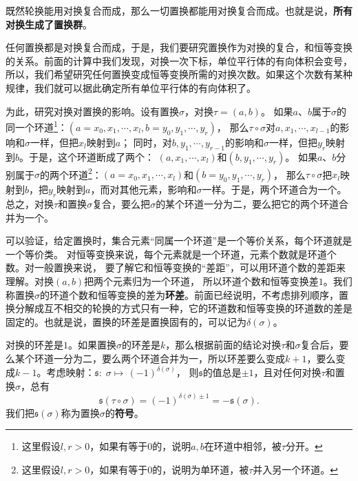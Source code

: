 \documentclass[12pt,UTF8,fontset=none]{ctexbook}
\begin{document}
既然轮换能用对换复合而成，那么一切置换都能用对换复合而成。也就是说，\textbf{所有对换生成了置换群}。

任何置换都是对换复合而成，于是，我们要研究置换作为对换的复合，和恒等变换的关系。前面的计算中我们发现，对换一次下标，单位平行体的有向体积会变号，所以，我们希望研究任何置换变成恒等变换所需的对换次数。如果这个次数有某种规律，我们就可以据此确定所有单位平行体的有向体积了。

为此，研究对换对置换的影响。设有置换$\sigma$，对换$\tau = (a, b)$。
如果$a$、$b$属于$\sigma$的同一个环道\footnote{这里假设$l,r>0$，如果有等于$0$的，说明$a,b$在环道中相邻，被$\tau$分开。}：$(a=x_0, x_1, \cdots, x_l, b=y_0, y_1, \cdots, y_r)$，
那么$\tau\circ\sigma$对$a,x_1, \cdots, x_{l-1}$的影响和$\sigma$一样，但把$x_l$映射到$a$；
同时，对$b,  y_1, \cdots, y_{r-1}$的影响和$\sigma$一样，但把$y_r$映射到$b$。于是，这个环道断成了两个：
$(a, x_1, \cdots, x_l)$和$(b, y_1, \cdots, y_r)$。
如果$a$、$b$分别属于$\sigma$的两个环道\footnote{这里假设$l,r>0$，如果有等于$0$的，说明为单环道，被$\tau$并入另一个环道。}：$(a=x_0, x_1, \cdots, x_l)$和$(b=y_0, y_1, \cdots, y_r)$，
那么$\tau\circ\sigma$把$x_l$映射到$b$，把$y_r$映射到$a$，而对其他元素，影响和$\sigma$一样。于是，两个环道合为一个。
总之，对换$\tau$和置换$\sigma$复合，要么把$\sigma$的某个环道一分为二，要么把它的两个环道合并为一个。

可以验证，给定置换时，集合元素“同属一个环道”是一个等价关系，每个环道就是一个等价类。
对恒等变换来说，每个元素就是一个环道，元素个数就是环道个数。对一般置换来说，
要了解它和恒等变换的“差距”，可以用环道个数的差距来理解。对换$(a, b)$把两个元素归为一个环道，
所以环道个数和恒等变换差$1$。我们称置换$\sigma$的环道个数和恒等变换的差为\textbf{环差}。前面已经说明，不考虑排列顺序，置换分解成互不相交的轮换的方式只有一种，它的环道数和恒等变换的环道数的差是固定的。也就是说，置换的环差是置换固有的，可以记为$\delta(\sigma)$。

对换的环差是$1$。如果置换$\sigma$的环差是$k$，那么根据前面的结论对换$\tau$和$\sigma$复合后，要么某个环道一分为二，要么两个环道合并为一，所以环差要么变成$k+1$，要么变成$k-1$。考虑映射：$\mathfrak{s}:\;\sigma \mapsto\, (-1)^{\delta(\sigma)}$，
则$\mathfrak{s}$的值总是$\pm 1$，且对任何对换$\tau$和置换$\sigma$，总有
$$\mathfrak{s}(\tau\circ\sigma) = (-1)^{\delta(\sigma)\pm 1} = -\mathfrak{s}(\sigma).$$
我们把$\mathfrak{s}(\sigma)$称为置换$\sigma$的\textbf{符号}。
\end{document}
